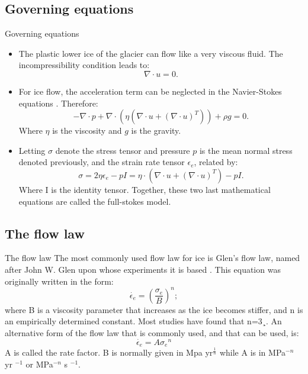 \documentclass[11pt]{beamer}
\begin{document}
	\subsection{Governing equations}
		\begin{frame}[allowframebreaks]{Governing equations}
		\begin{itemize}
		\item The plastic lower ice of the glacier can flow like a very viscous fluid. The incompressibility condition leads to: 
		\begin{equation}
			\nabla \cdot u=0.
		\end{equation}
		\item For ice flow, the acceleration term can be neglected in the Navier-Stokes equations \cite[]{hutter1982mathematical}. Therefore:
		\begin{equation}
			-\nabla \cdot p+\nabla \cdot (\eta (\nabla \cdot u+(\nabla \cdot u)^T))+\rho g = 0.
		\end{equation}
		Where $\eta$ is the viscosity and $g$ is the gravity.
		\item Letting $\sigma$ denote the stress tensor and pressure $p$ is the mean normal stress denoted previously, and the strain rate tensor $\epsilon_{e}$, related by:
		\begin{equation}
			\sigma=2\eta \epsilon_{e}-pI = \eta \cdot(\nabla \cdot u+(\nabla \cdot u)^T)-pI.
		\end{equation}
		Where I is the identity tensor. Together, these two last mathematical equations are called the full-stokes model.
		\end{itemize}
		\end{frame}
	\subsection{The flow law}
		\begin{frame}{The flow law}
			\justifying
			The most commonly used ﬂow law for ice is Glen’s ﬂow law, named after John W. Glen upon whose experiments it is based \cite{glen1958flow}. This equation was originally written in the form:
			\begin{equation}
				\dot{\epsilon_{e}}=({\frac{\sigma_{e}}{B}})^n;
			\end{equation}
			where B is a viscosity parameter that increases as the ice becomes stiffer, and n is an empirically determined constant. Most studies have found that n=3¸. An alternative form of the ﬂow law that is commonly used, and that can be used, is:
			\begin{equation}
				\dot{\epsilon_{e}}=A{\sigma_{e}}^n
			\end{equation}
			A is called the rate factor. B is normally given in Mpa yr$^{\frac{1}{n}}$ while A is in MPa$^{-n}$ yr $^{-1}$ or MPa$^{-n}$ s $^{-1}$.
		\end{frame}
\end{document}
